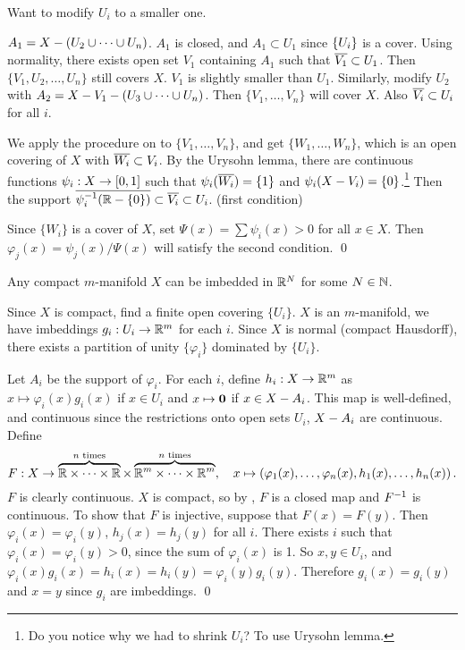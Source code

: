 \pf Want to modify \(U_i\) to a smaller one.

 \(A_1 = X \bs (U_2 \cup \cdots \cup U_n)\). \(A_1\) is closed, and \(A_1 \subset U_1\) since \(\seq{U_i}\) is a cover. Using normality, there exists open set \(V_1\) containing \(A_1\) such that \(\cl{V_1} \subset U_1\). Then \(\{V_1, U_2, \dots, U_n\}\) still covers \(X\). \(V_1\) is slightly smaller than \(U_1\). Similarly, modify \(U_2\) with \(A_2 = X \bs V_1 \bs (U_3 \cup \cdots \cup U_n)\). Then \(\{V_1, \dots, V_n\}\) will cover \(X\). Also \(\cl{V_i} \subset U_i\) for all \(i\).

 We apply the procedure on  to \(\{V_1, \dots, V_n\}\), and get \(\{W_1, \dots, W_n\}\), which is an open covering of \(X\) with \(\cl{W_i} \subset V_i\). By the Urysohn lemma, there are continuous functions \(\psi_i : X \ra [0, 1]\) such that \(\psi_i(\cl{W_i}) = \{1\}\) and \(\psi_i(X \bs V_i) = \{0\}\).\footnote{Do you notice why we had to shrink \(U_i\)? To use Urysohn lemma.} Then the support \(\cl{\psi_i\inv(\R \bs \{0\})} \subset \cl{V_i} \subset U_i\). (first condition)

Since \(\{W_i\}\) is a cover of \(X\), set \(\Psi(x) = \sum \psi_i(x) > 0\) for all \(x \in X\). Then \(\varphi_j(x) = \psi_j(x) / \Psi(x)\) will satisfy the second condition. \qed

 Any compact \(m\)-manifold \(X\) can be imbedded in \(\R^N\) for some \(N \in \N\).

\pf Since \(X\) is compact, find a finite open covering \(\{U_i\}\). \(X\) is an \(m\)-manifold, we have imbeddings \(g_i : U_i \ra \R^m\) for each \(i\). Since \(X\) is normal (compact Hausdorff), there exists a partition of unity \(\{\varphi_i\}\) dominated by \(\{U_i\}\).

Let \(A_i\) be the support of \(\varphi_i\). For each \(i\), define \(h_i : X \ra \R^m\) as \(x \mapsto \varphi_i(x)g_i(x)\) if \(x \in U_i\) and \(x \mapsto \bf{0}\) if \(x \in X \bs A_i\). This map is well-defined, and continuous since the restrictions onto open sets \(U_i\), \(X \bs A_i\) are continuous. Define
\[
    F : X \ra \overbrace{\R \times \cdots \times \R}^{n \text{ times}} \times \overbrace{\R^m \times \cdots \times \R^m}^{n \text{ times}}, \quad x \mapsto \paren{\varphi_1(x), \dots, \varphi_n(x), h_1(x), \dots, h_n(x)}.
\]
\(F\) is clearly continuous. \(X\) is compact, so by , \(F\) is a closed map and \(F\inv\) is continuous. To show that \(F\) is injective, suppose that \(F(x) = F(y)\). Then \(\varphi_i(x) = \varphi_i(y)\), \(h_j(x) = h_j(y)\) for all \(i\). There exists \(i\) such that \(\varphi_i(x) = \varphi_i(y) > 0\), since the sum of \(\varphi_i(x)\) is 1. So \(x, y \in U_i\), and \(\varphi_i(x) g_i(x) = h_i(x) = h_i(y) = \varphi_i(y) g_i(y)\). Therefore \(g_i(x) = g_i(y)\) and \(x = y\) since \(g_i\) are imbeddings. \qed

